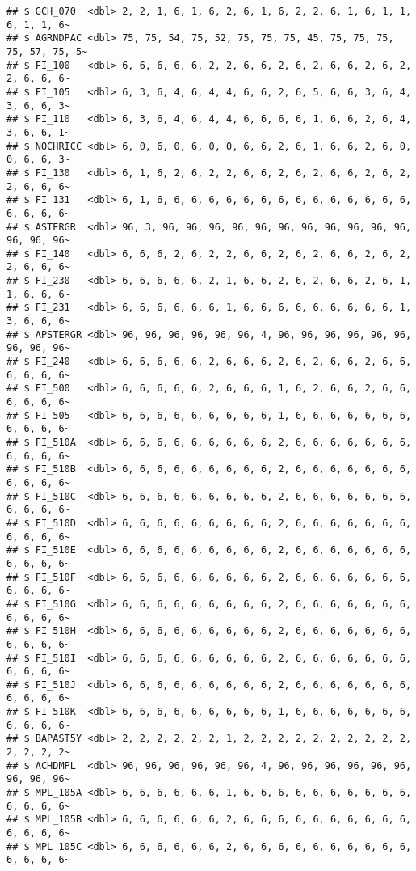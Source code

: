 \documentclass[
]{article}
\begin{document}
\begin{verbatim}
## $ GCH_070  <dbl> 2, 2, 1, 6, 1, 6, 2, 6, 1, 6, 2, 2, 6, 1, 6, 1, 1, 6, 1, 1, 6~
## $ AGRNDPAC <dbl> 75, 75, 54, 75, 52, 75, 75, 75, 45, 75, 75, 75, 75, 57, 75, 5~
## $ FI_100   <dbl> 6, 6, 6, 6, 6, 2, 2, 6, 6, 2, 6, 2, 6, 6, 2, 6, 2, 2, 6, 6, 6~
## $ FI_105   <dbl> 6, 3, 6, 4, 6, 4, 4, 6, 6, 2, 6, 5, 6, 6, 3, 6, 4, 3, 6, 6, 3~
## $ FI_110   <dbl> 6, 3, 6, 4, 6, 4, 4, 6, 6, 6, 6, 1, 6, 6, 2, 6, 4, 3, 6, 6, 1~
## $ NOCHRICC <dbl> 6, 0, 6, 0, 6, 0, 0, 6, 6, 2, 6, 1, 6, 6, 2, 6, 0, 0, 6, 6, 3~
## $ FI_130   <dbl> 6, 1, 6, 2, 6, 2, 2, 6, 6, 2, 6, 2, 6, 6, 2, 6, 2, 2, 6, 6, 6~
## $ FI_131   <dbl> 6, 1, 6, 6, 6, 6, 6, 6, 6, 6, 6, 6, 6, 6, 6, 6, 6, 6, 6, 6, 6~
## $ ASTERGR  <dbl> 96, 3, 96, 96, 96, 96, 96, 96, 96, 96, 96, 96, 96, 96, 96, 96~
## $ FI_140   <dbl> 6, 6, 6, 2, 6, 2, 2, 6, 6, 2, 6, 2, 6, 6, 2, 6, 2, 2, 6, 6, 6~
## $ FI_230   <dbl> 6, 6, 6, 6, 6, 2, 1, 6, 6, 2, 6, 2, 6, 6, 2, 6, 1, 1, 6, 6, 6~
## $ FI_231   <dbl> 6, 6, 6, 6, 6, 6, 1, 6, 6, 6, 6, 6, 6, 6, 6, 6, 1, 3, 6, 6, 6~
## $ APSTERGR <dbl> 96, 96, 96, 96, 96, 96, 4, 96, 96, 96, 96, 96, 96, 96, 96, 96~
## $ FI_240   <dbl> 6, 6, 6, 6, 6, 2, 6, 6, 6, 2, 6, 2, 6, 6, 2, 6, 6, 6, 6, 6, 6~
## $ FI_500   <dbl> 6, 6, 6, 6, 6, 2, 6, 6, 6, 1, 6, 2, 6, 6, 2, 6, 6, 6, 6, 6, 6~
## $ FI_505   <dbl> 6, 6, 6, 6, 6, 6, 6, 6, 6, 1, 6, 6, 6, 6, 6, 6, 6, 6, 6, 6, 6~
## $ FI_510A  <dbl> 6, 6, 6, 6, 6, 6, 6, 6, 6, 2, 6, 6, 6, 6, 6, 6, 6, 6, 6, 6, 6~
## $ FI_510B  <dbl> 6, 6, 6, 6, 6, 6, 6, 6, 6, 2, 6, 6, 6, 6, 6, 6, 6, 6, 6, 6, 6~
## $ FI_510C  <dbl> 6, 6, 6, 6, 6, 6, 6, 6, 6, 2, 6, 6, 6, 6, 6, 6, 6, 6, 6, 6, 6~
## $ FI_510D  <dbl> 6, 6, 6, 6, 6, 6, 6, 6, 6, 2, 6, 6, 6, 6, 6, 6, 6, 6, 6, 6, 6~
## $ FI_510E  <dbl> 6, 6, 6, 6, 6, 6, 6, 6, 6, 2, 6, 6, 6, 6, 6, 6, 6, 6, 6, 6, 6~
## $ FI_510F  <dbl> 6, 6, 6, 6, 6, 6, 6, 6, 6, 2, 6, 6, 6, 6, 6, 6, 6, 6, 6, 6, 6~
## $ FI_510G  <dbl> 6, 6, 6, 6, 6, 6, 6, 6, 6, 2, 6, 6, 6, 6, 6, 6, 6, 6, 6, 6, 6~
## $ FI_510H  <dbl> 6, 6, 6, 6, 6, 6, 6, 6, 6, 2, 6, 6, 6, 6, 6, 6, 6, 6, 6, 6, 6~
## $ FI_510I  <dbl> 6, 6, 6, 6, 6, 6, 6, 6, 6, 2, 6, 6, 6, 6, 6, 6, 6, 6, 6, 6, 6~
## $ FI_510J  <dbl> 6, 6, 6, 6, 6, 6, 6, 6, 6, 2, 6, 6, 6, 6, 6, 6, 6, 6, 6, 6, 6~
## $ FI_510K  <dbl> 6, 6, 6, 6, 6, 6, 6, 6, 6, 1, 6, 6, 6, 6, 6, 6, 6, 6, 6, 6, 6~
## $ BAPAST5Y <dbl> 2, 2, 2, 2, 2, 2, 1, 2, 2, 2, 2, 2, 2, 2, 2, 2, 2, 2, 2, 2, 2~
## $ ACHDMPL  <dbl> 96, 96, 96, 96, 96, 96, 4, 96, 96, 96, 96, 96, 96, 96, 96, 96~
## $ MPL_105A <dbl> 6, 6, 6, 6, 6, 6, 1, 6, 6, 6, 6, 6, 6, 6, 6, 6, 6, 6, 6, 6, 6~
## $ MPL_105B <dbl> 6, 6, 6, 6, 6, 6, 2, 6, 6, 6, 6, 6, 6, 6, 6, 6, 6, 6, 6, 6, 6~
## $ MPL_105C <dbl> 6, 6, 6, 6, 6, 6, 2, 6, 6, 6, 6, 6, 6, 6, 6, 6, 6, 6, 6, 6, 6~

\end{verbatim}
\end{document}
